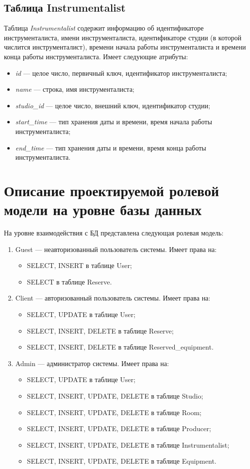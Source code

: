 \subsection{Таблица Instrumentalist}
Таблица \textit{Instrumentalist} содержит информацию об идентификаторе инструменталиста, имени инструменталиста, идентификаторе студии (в которой числится инструменталист), времени начала работы инструменталиста и времени конца работы инструменталиста.
Имеет следующие атрибуты:
\begin{itemize}
	\item \textit{id} --- целое число, первичный ключ, идентификатор инструменталиста;
	\item \textit{name} --- строка, имя инструменталиста;
	\item \textit{studio\_id} --- целое число, внешний ключ, идентификатор студии;
	\item \textit{start\_time} --- тип хранения даты и времени, время начала работы инструменталиста;
	\item \textit{end\_time} --- тип хранения даты и времени, время конца работы инструменталиста.
\end{itemize}

\section{Описание проектируемой ролевой модели на уровне базы данных}
На уровне взаимодействия с БД представлена следующая ролевая модель:
\begin{enumerate}
	\item Guest --- неавторизованный пользователь системы. Имеет права на:
	\begin{itemize}
		\item SELECT, INSERT в таблице User;
		\item SELECT в таблице Reserve.
	\end{itemize}
	\item Client --- авторизованный пользователь системы. Имеет права на:
	\begin{itemize}
		\item SELECT, UPDATE в таблице User;
		\item SELECT, INSERT, DELETE в таблице Reserve;
		\item SELECT, INSERT, DELETE в таблице Reserved\_equipment.
	\end{itemize}
	\item Admin --- администратор системы. Имеет права на:
	\begin{itemize}
	\item SELECT, UPDATE в таблице User;
	\item SELECT, INSERT, UPDATE, DELETE в таблице Studio;
	\item SELECT, INSERT, UPDATE, DELETE в таблице Room;
	\item SELECT, INSERT, UPDATE, DELETE в таблице Producer;
	\item SELECT, INSERT, UPDATE, DELETE в таблице Instrumentalist;
	\item SELECT, INSERT, UPDATE, DELETE в таблице Equipment.
	\end{itemize}
\end{enumerate} 

